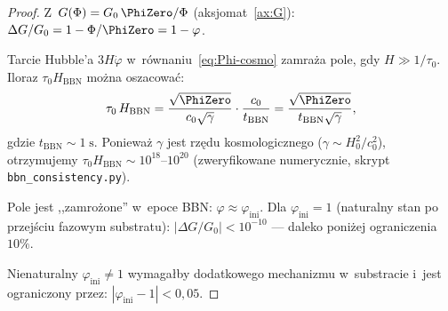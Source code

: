 \begin{proof}
Z~$G(\Phi) = G_0\,\PhiZero/\Phi$ (aksjomat~\ref{ax:G}):
$\Delta G/G_0 = 1 - \Phi/\PhiZero = 1 - \varphi$.

Tarcie Hubble'a $3H\dot\varphi$ w~r\'ownaniu~\eqref{eq:Phi-cosmo}
zamra\.za pole, gdy $H \gg 1/\tau_0$. Iloraz
$\tau_0 H_{\mathrm{BBN}}$ mo\.zna oszacowa\'c:
\[
  \tau_0\,H_{\mathrm{BBN}}
  = \frac{\sqrt{\PhiZero}}{c_0\sqrt{\gamma}}
    \cdot\frac{c_0}{t_{\mathrm{BBN}}}
  = \frac{\sqrt{\PhiZero}}{t_{\mathrm{BBN}}\sqrt{\gamma}},
\]
gdzie $t_{\mathrm{BBN}} \sim 1\;\mathrm{s}$. Poniewa\.z $\gamma$
jest rz\k{e}du kosmologicznego ($\gamma \sim H_0^2/c_0^2$),
otrzymujemy $\tau_0 H_{\mathrm{BBN}} \sim 10^{18}$--$10^{20}$
(zweryfikowane numerycznie, skrypt \texttt{bbn\_consistency.py}).

Pole jest ,,zamro\.zone'' w~epoce BBN: $\varphi \approx \varphi_{\mathrm{ini}}$.
Dla $\varphi_{\mathrm{ini}} = 1$ (naturalny stan po przej\'sciu fazowym substratu):
$|\Delta G/G_0| < 10^{-10}$ --- daleko poni\.zej ograniczenia~$10\%$.

Nienaturalny $\varphi_{\mathrm{ini}} \neq 1$ wymaga\l{}by dodatkowego
mechanizmu w~substracie i~jest ograniczony przez:
$|\varphi_{\mathrm{ini}} - 1| < 0{,}05$.
\end{proof}

